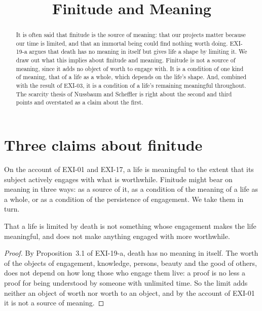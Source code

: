 \documentclass{situationist-preprint}
\title{Finitude and Meaning}
\begin{document}
\maketitle

\begin{abstract}
It is often said that finitude is the source of meaning: that our projects matter because our time is limited, and that an immortal being could find nothing worth doing. EXI-19-a argues that death has no meaning in itself but gives life a shape by limiting it. We draw out what this implies about finitude and meaning. Finitude is not a source of meaning, since it adds no object of worth to engage with. It is a condition of one kind of meaning, that of a life as a whole, which depends on the life's shape. And, combined with the result of EXI-03, it is a condition of a life's remaining meaningful throughout. The scarcity thesis of Nussbaum and Scheffler is right about the second and third points and overstated as a claim about the first.
\end{abstract}

\section{Three claims about finitude}

On the account of EXI-01 and EXI-17, a life is meaningful to the extent that its subject actively engages with what is worthwhile. Finitude might bear on meaning in three ways: as a source of it, as a condition of the meaning of a life as a whole, or as a condition of the persistence of engagement. We take them in turn.

\begin{proposition}\label{p:source}
That a life is limited by death is not something whose engagement makes the life meaningful, and does not make anything engaged with more worthwhile.
\end{proposition}

\begin{proof}
By Proposition~3.1 of EXI-19-a, death has no meaning in itself. The worth of the objects of engagement, knowledge, persons, beauty and the good of others, does not depend on how long those who engage them live: a proof is no less a proof for being understood by someone with unlimited time. So the limit adds neither an object of worth nor worth to an object, and by the account of EXI-01 it is not a source of meaning.
\end{proof}
\end{document}
